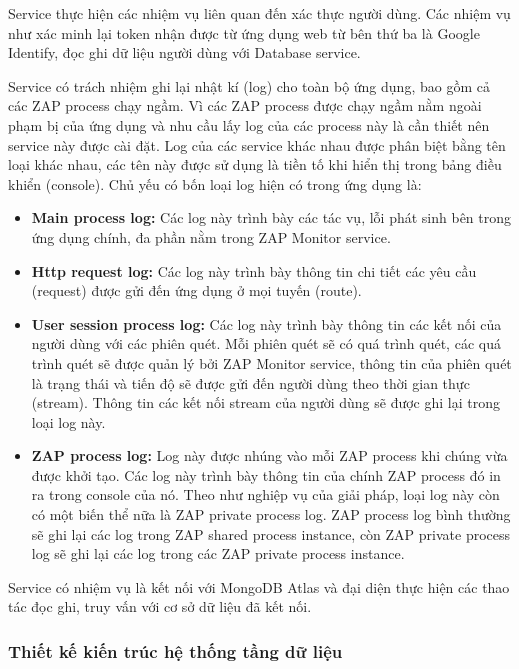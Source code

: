 \tab \tab Service thực hiện các nhiệm vụ liên quan đến xác thực người dùng.
Các nhiệm vụ như xác minh lại token nhận được từ ứng dụng web từ bên thứ ba là Google Identify, đọc ghi dữ liệu người dùng với Database service.

\tab \tab Service có trách nhiệm ghi lại nhật kí (log) cho toàn bộ ứng dụng, bao gồm cả các ZAP process chạy ngầm.
Vì các ZAP process được chạy ngầm nằm ngoài phạm bị của ứng dụng và nhu cầu lấy log của các process này là cần thiết nên service này được cài đặt.
Log của các service khác nhau được phân biệt bằng tên loại khác nhau, các tên này được sử dụng là tiền tố khi hiển thị trong bảng điều khiển (console).
Chủ yếu có bốn loại log hiện có trong ứng dụng là:

\begin{itemize}
    \item \textbf{Main process log:} Các log này trình bày các tác vụ, lỗi phát sinh bên trong ứng dụng chính, đa phần nằm trong ZAP Monitor service.
    \item \textbf{Http request log:} Các log này trình bày thông tin chi tiết các yêu cầu (request) được gửi đến ứng dụng ở mọi tuyến (route).
    \item \textbf{User session process log:} Các log này trình bày thông tin các kết nối của người dùng với các phiên quét.
          Mỗi phiên quét sẽ có quá trình quét, các quá trình quét sẽ được quản lý bởi ZAP Monitor service, thông tin của phiên quét là trạng thái và tiến độ sẽ được gửi đến người dùng theo thời gian thực (stream).
          Thông tin các kết nối stream của người dùng sẽ được ghi lại trong loại log này.
    \item \textbf{ZAP process log:} Log này được nhúng vào mỗi ZAP process khi chúng vừa được khởi tạo.
          Các log này trình bày thông tin của chính ZAP process đó in ra trong console của nó.
          Theo như nghiệp vụ của giải pháp, loại log này còn có một biến thể nữa là ZAP private process log.
          ZAP process log bình thường sẽ ghi lại các log trong ZAP shared process instance, còn ZAP private process log sẽ ghi lại các log trong các ZAP private process instance.
\end{itemize}

\tab \tab Service có nhiệm vụ là kết nối với MongoDB Atlas và đại diện thực hiện các thao tác đọc ghi, truy vấn với cơ sở dữ liệu đã kết nối.

\subsubsection{Thiết kế kiến trúc hệ thống tầng dữ liệu}

